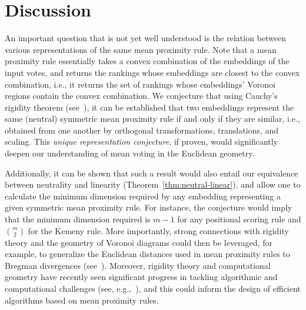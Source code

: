 \documentclass[prodmode]{acmsmall-ec14}
\begin{document}

\section{Discussion}
\label{sec:disc}

An important question that is not yet well understood is the relation between various representations of the same mean proximity rule. Note that a mean proximity rule essentially takes a convex combination of the embeddings of the input votes, and returns the rankings whose embeddings are closest to the convex combination, i.e., it returns the set of rankings whose embeddings' Voronoi regions contain the convex combination. We conjecture that using Cauchy's rigidity theorem (see~\cite{aigner2010cauchy}), it can be established that two embeddings represent the same (neutral) symmetric mean proximity rule if and only if they are similar, i.e., obtained from one another by orthogonal transformations, translations, and scaling. This \emph{unique representation conjecture}, if proven, would significantly deepen our understanding of mean voting in the Euclidean geometry. 

Additionally, it can be shown that such a result would also entail our equivalence between neutrality and linearity (Theorem~\ref{thm:neutral-linear}), and allow one to calculate the minimum dimension required by any embedding representing a given symmetric mean proximity rule. For instance, the conjecture would imply that the minimum dimension required is $m-1$ for any positional scoring rule and $\binom{m}{2}$ for the Kemeny rule.  More importantly, strong connections with rigidity theory and the geometry of Voronoi diagrams could then be leveraged, for example, to generalize the Euclidean distances used in mean proximity rules to Bregman divergences (see~\cite{boissonnat2010bregman}). Moreover, rigidity theory and computational geometry have recently seen significant progress in tackling algorithmic and computational challenges (see, e.g.,~\cite{biedl2007cauchy}), and this could inform the design of efficient algorithms based on mean proximity rules. 




\end{document}
